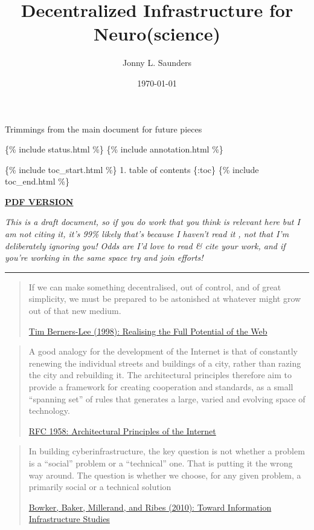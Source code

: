 \documentclass[10pt]{article}
\title{Decentralized Infrastructure for Neuro(science)}
\author{Jonny L. Saunders}
\date{\today}
\begin{document}
\maketitle
\tableofcontents
\pagebreak

Trimmings {from the main document for future pieces}

\{\% include status.html \%\} \{\% include annotation.html \%\}

\{\% include toc\_start.html \%\} 1. table of contents \{:toc\} \{\%
include toc\_end.html \%\}

\href{https://jon-e.net/infrastructure/tex/decentralized_infrastructure_render.pdf}{\textbf{PDF
VERSION}}

\emph{This is a draft document, so if you do work that you think is
relevant here but I am not citing it, it's 99\% likely that's because I
haven't read it , not that I'm deliberately ignoring you! Odds are I'd
love to read \& cite your work, and if you're working in the same space
try and join efforts!}

\begin{center}\rule{0.5\linewidth}{0.5pt}\end{center}

\begin{quote}
If we can make something decentralised, out of control, and of great
simplicity, we must be prepared to be astonished at whatever might grow
out of that new medium.

\href{https://www.w3.org/1998/02/Potential.html}{Tim Berners-Lee (1998):
Realising the Full Potential of the Web}
\end{quote}

\begin{quote}
A good analogy for the development of the Internet is that of constantly
renewing the individual streets and buildings of a city, rather than
razing the city and rebuilding it. The architectural principles
therefore aim to provide a framework for creating cooperation and
standards, as a small ``spanning set'' of rules that generates a large,
varied and evolving space of technology.

\href{https://datatracker.ietf.org/doc/html/rfc1958}{RFC 1958:
Architectural Principles of the Internet}
\end{quote}

\begin{quote}
In building cyberinfrastructure, the key question is not whether a
problem is a ``social'' problem or a ``technical'' one. That is putting
it the wrong way around. The question is whether we choose, for any
given problem, a primarily social or a technical solution

\href{https://doi.org/10.1007/978-1-4020-9789-8_5}{Bowker, Baker,
Millerand, and Ribes (2010): Toward Information Infrastructure Studies}
\cite{bowkerInformationInfrastructureStudies2010} 
\end{quote}
\end{document}
